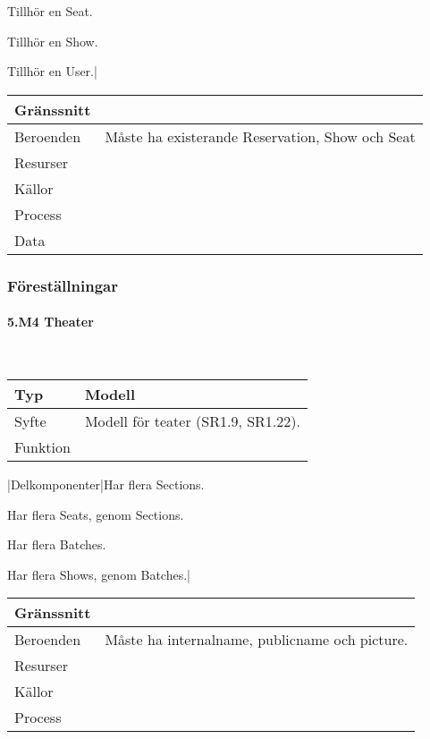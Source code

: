 \documentclass[a4paper, twoside, 11pt, titlepage]{article}
\begin{document}
			Tillhör en Seat.

			Tillhör en Show.

			Tillhör en User.|

			\begin {table} [ht] \begin{tabular} {  p{3.5cm} p{9.6cm} }
				\hline
				Gränssnitt &   \\
				\hline
				Beroenden & Måste ha existerande Reservation, Show och Seat  \\
				\hline
				Resurser &   \\
				\hline
				Källor &   \\
				\hline
				Process &   \\
				\hline
				Data &   \\
				\hline
			\end{tabular} \end{table} \FloatBarrier


		\subsubsection{Föreställningar}



			\paragraph{5.M4 Theater}\

			\begin {table} [ht] \begin{tabular} {  p{3.5cm} p{9.6cm} }
				\hline
				Typ & Modell  \\
				\hline
				Syfte & Modell för teater (SR1.9, SR1.22).  \\
				\hline
				Funktion &   \\
				\hline
			\end{tabular} \end{table} \FloatBarrier
			\vspace{6mm}

			|Delkomponenter|Har flera Sections.

			Har flera Seats, genom Sections.

			Har flera Batches.

			Har flera Shows, genom Batches.|

			\begin {table} [ht] \begin{tabular} {  p{3.5cm} p{9.6cm} }
				\hline
				Gränssnitt &   \\
				\hline
				Beroenden & Måste ha internalname, publicname och picture.  \\
				\hline
				Resurser &   \\
				\hline
				Källor &   \\
				\hline
				Process &   \\
				\hline
			\end{tabular} \end{table} \FloatBarrier
			\vspace{6mm}
\end{document}
